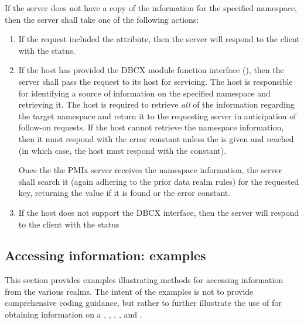 If the server does not have a copy of the information for the specified
namespace, then the server shall take one of the following actions:
\begin{enumerate}
    \item If the request included the  attribute, then
    the server will respond to the client with the
     status.
    \item If the host has provided the \ac{DBCX} module function interface
    (), then the server shall pass the
    request to its host for servicing. The host is responsible for identifying
    a source of information on the specified namespace and retrieving it. The
    host is required to retrieve \emph{all} of the information regarding the target namespace
    and return it to the requesting server in anticipation of follow-on
    requests. If the host cannot retrieve the
    namespace information, then it must respond with the  error constant unless the  is given and reached (in which case, the host must respond with the  constant).

    Once the the \ac{PMIx} server receives the namespace information, the server shall search it (again adhering to the prior data realm rules) for the requested key, returning the value if it is found or the  error constant.
    \item If the host does not support the \ac{DBCX} interface, then the
    server will respond to the client with the 
    status
\end{enumerate}


\subsection{Accessing information: examples}
\label{chap:api_kv:getex}

This section provides examples illustrating methods for accessing information from the various realms. The intent of the examples is not to provide comprehensive coding guidance, but rather to further illustrate the use of  for obtaining information on a , , , , and .


